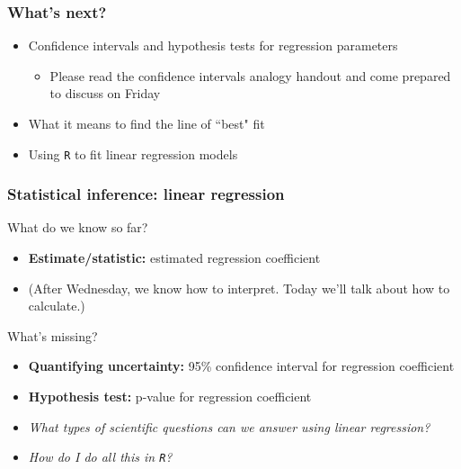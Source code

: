 \documentclass[12pt, 
hyperref={colorlinks=true, linkcolor=blue, urlcolor=cyan},dvipsnames]{beamer}
\begin{document}
\begin{frame}
\frametitle{What's next?}

\begin{itemize}
\item Confidence intervals and hypothesis tests for regression parameters
	\begin{itemize}
	\item \color{blue} Please read the confidence intervals analogy handout and come prepared to discuss on Friday \color{black}
	\end{itemize}
\item What it means to find the line of ``best" fit
\item Using \texttt{R} to fit linear regression models 
\end{itemize}

\end{frame}

\begin{frame}
\frametitle{Statistical inference: linear regression}

\color{blue} What do we know so far? \color{black}%
\begin{itemize}
\item \textbf{Estimate/statistic:} estimated regression coefficient
\item[] (After Wednesday, we know how to interpret. Today we'll talk about how to calculate.)
\end{itemize}

\color{blue} What's missing? \color{black}\pause %
\begin{itemize}
\item \textbf{Quantifying uncertainty:} 95\% confidence interval for regression coefficient
\item \textbf{Hypothesis test:} p-value for regression coefficient \pause
\item \textit{What types of scientific questions can we answer using linear regression?}
\item \textit{How do I do all this in \texttt{R}?}
\end{itemize}

\end{frame}


\end{document}
